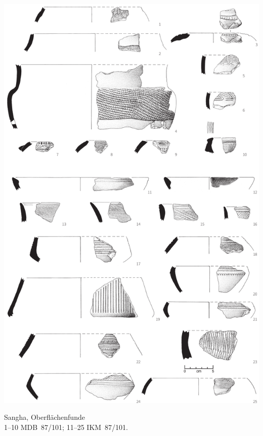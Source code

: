\begin{pl}[H]
	\includegraphics{plt/Taf58.pdf}
	\vspace{.75em}\caption{\mbox{Sangha}, Oberflächenfunde \\ 1--10 MDB~87/101; 11--25 IKM~87/101.}
	\label{pl:58}
\end{pl}

